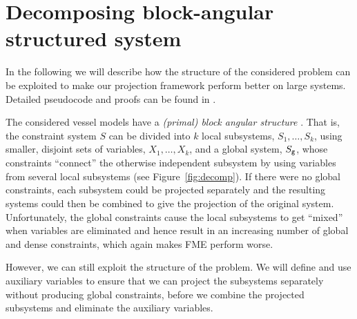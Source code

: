 %
%
\section{Decomposing block-angular structured system}
\label{sec:decomp}
In the following we will describe how the structure of the considered problem can be exploited to make our projection framework perform better on large systems. Detailed pseudocode and proofs can be found in \cite{MyTechRep}. 

The considered vessel models have a \emph{(primal) block angular structure} \cite{williams}. That is, the constraint system $S$ can be divided into $k$ local subsystems, $S_1, \ldots, S_k$, using smaller, disjoint sets of variables, $X_1, \ldots, X_k$, and a global system, $S_{\texttt{g}}$, whose constraints ``connect'' the otherwise independent subsystem by using variables from several local subsystems (see Figure~\ref{fig:decomp}). 
%
If there were no global constraints, each subsystem could be projected separately and the resulting systems could then be combined to give the projection of the original system. 
Unfortunately, the global constraints cause the local subsystems to get ``mixed'' when variables are eliminated and hence result in an increasing number of global and dense constraints, which again makes FME perform worse.

However, we can still exploit the structure of the problem. We will define and use auxiliary variables to ensure that we can project the subsystems separately without producing global constraints, before we combine the projected  subsystems and eliminate the auxiliary variables.
 
